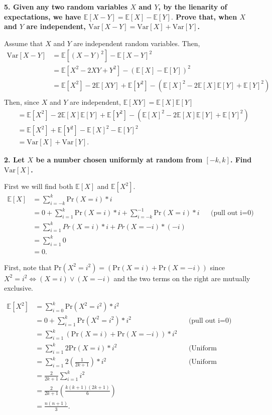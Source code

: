 \documentclass[letterpaper, 12pt]{article}
\newcommand{\E}{ \mathbb{E} }
\newcommand{\Var}{ \text{Var} }
\newcommand{\Pr}{ \text{Pr} }
\begin{document}
\noindent\textbf{5. Given any two random variables $X$ and $Y$, by the lienarity of expectations, we have $\E[X - Y] = \E[X] - \E[Y].$ Prove that, when $X$ and $Y$ are independent, $\Var[X - Y] = \Var[X] + \Var[Y]$.}

Assume that $X$ and $Y$ are independent random variables. Then,
\begin{align*}
    \Var[X - Y] &= \E[(X - Y)^2] - \E[X - Y]^2 \\ 
                &= \E[X^2 - 2XY + Y^2] - (\E[X] - \E[Y])^2 \\
                &= \E[X^2] - 2\E[XY] + \E[Y^2] - (\E[X]^2 - 2\E[X]\E[Y] + \E[Y]^2)  \\ 
\end{align*}
Then, since $X$ and $Y$ are independent, $\E[XY] = \E[X]\E[Y]$
\begin{align*}
                &= \E[X^2] - 2\E[X]\E[Y] + \E[Y^2] - (\E[X]^2 - 2\E[X]\E[Y] + \E[Y]^2)  \\
                &= \E[X^2] + \E[Y^2] - \E[X]^2 - \E[Y]^2 \\
                &= \Var[X] + \Var[Y].
\end{align*}

\noindent\textbf{2. Let $X$ be a number chosen uniformly at random from $[-k, k]$. Find $\Var[X]$.}

First we will find both $\E[X]$ and $\E[X^2]$.
\begin{align*}
    \E[X] &= \sum_{i=-k}^{k} \Pr(X = i) * i \\
          &= 0 + \sum_{i=1}^{k}\Pr(X = i) * i + \sum_{i=-k}^{-1}\Pr(X = i) * i && \text{(pull out i=0)} \\
          &= \sum_{i=1}^k Pr(X = i) * i + Pr(X = -i) * (-i) \\
          &= \sum_{i=1}^k 0 \\
          &= 0.
\end{align*}

First, note that $\Pr(X^2 = i^2) = (\Pr(X = i) + \Pr(X = -i))$ since $X^2 = i^2 \Leftrightarrow (X = i) \lor (X = -i)$ and the two terms on the right are mutually exclusive.

\begin{align*}
    \E[X^2] &= \sum_{i=0}^k \Pr(X^2 = i^2) * i^2 \\
            &= 0 + \sum_{i=1}^{k}\Pr(X^2 = i^2) * i^2 && \text{(pull out i=0)} \\
            &= \sum_{i=1}^{k}(\Pr(X = i) + \Pr(X = -i)) * i^2 \\
            &= \sum_{i=1}^{k} 2\Pr(X = i) * i^2 && \text{(Uniform distribution)}\\
            &= \sum_{i=1}^{k} 2(\frac{1}{2k + 1}) * i^2 && \text{(Uniform distribution)}\\
            &= \frac{2}{2k + 1} \sum_{i=1}^{k} i^2 \\
            &= \frac{2}{2k + 1} (\frac{k(k+1)(2k+1)}{6}) \\
            &= \frac{n(n+1)}{3}.
\end{align*}
\end{document}
